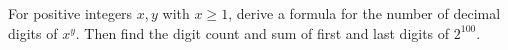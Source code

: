 For positive integers $x,y$ with $x\ge1$, derive a formula for the number of decimal digits of $x^y$. Then find the digit count and sum of first and last digits of $2^{100}$.
